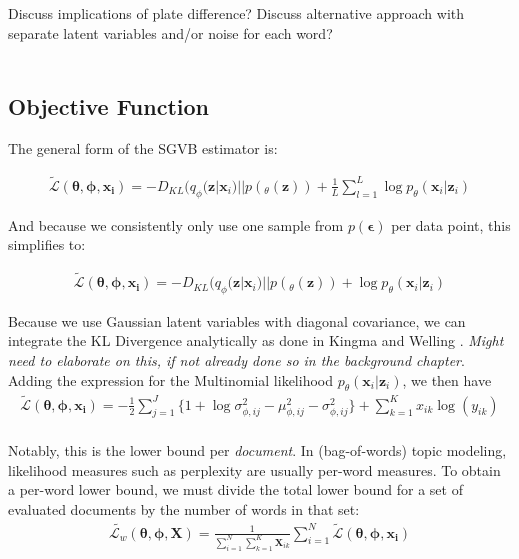 \documentclass{report}
\begin{document}
Discuss implications of plate difference? Discuss alternative approach with separate latent variables and/or noise for each word?\\ \\

\subsection{Objective Function}
The general form of the SGVB estimator is:

\begin{align}
\tilde{\mathcal{L}}(\boldsymbol{\theta}, \boldsymbol{\phi}, \mathbf{x_i}) = -D_{KL}(q_\phi (\mathbf{z}|\mathbf{x}_i)||p(_\theta(\mathbf{z}))  + \frac{1}{L}\sum_{l=1}^{L}\log p_\theta(\mathbf{x}_i|\mathbf{z}_i)
\end{align}

And because we consistently only use one sample from $p(\boldsymbol{\epsilon})$ per data point, this simplifies to:

\begin{align}
\tilde{\mathcal{L}}(\boldsymbol{\theta}, \boldsymbol{\phi}, \mathbf{x_i}) = -D_{KL}(q_\phi (\mathbf{z}|\mathbf{x}_i)||p(_\theta(\mathbf{z}))  + \log p_\theta(\mathbf{x}_i|\mathbf{z}_i)
\end{align}

Because we use Gaussian latent variables with diagonal covariance, we can integrate the KL Divergence analytically as done in Kingma and Welling \cite{kingma2013auto}. \textit{Might need to elaborate on this, if not already done so in the background chapter}. Adding the expression for the Multinomial likelihood $p_\theta(\mathbf{x}_i|\mathbf{z}_i)$, we then have
\begin{align}\label{LBest}
\tilde{\mathcal{L}}(\boldsymbol{\theta}, \boldsymbol{\phi}, \mathbf{x_i}) = - \frac{1}{2}\sum\limits_{j=1}^{J}\{1+\log \sigma_{\phi ,ij}^2 - \mu_{\phi,ij}^2 - \sigma_{\phi ,ij}^2\}  + 
\sum_{k=1}^K x_{ik} \log (y_{ik})
\end{align}
\\
Notably, this is the lower bound per \textit{document}. In (bag-of-words) topic modeling, likelihood measures such as perplexity are usually per-word measures. To obtain a per-word lower bound, we must divide the total lower bound for a set of evaluated documents by the number of words in that set: 
\begin{align}\label{perwordLBest}
\tilde{\mathcal{L}_w}(\boldsymbol{\theta}, \boldsymbol{\phi}, \mathbf{X}) = \frac{1}{\sum\limits_{i=1}^{N}\sum\limits_{k=1}^{K}\mathbf{X}_{ik}}\sum\limits_{i=1}^N \tilde{\mathcal{L}}(\boldsymbol{\theta}, \boldsymbol{\phi}, \mathbf{x_i})
\end{align}
\end{document}

